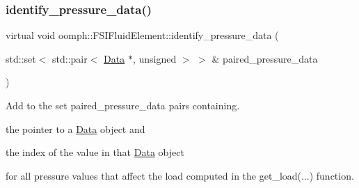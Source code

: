 \mbox{\label{classoomph_1_1FSIFluidElement_af8e0805b769b7d111eb71f223fc83df8}} 
\subsubsection{\texorpdfstring{identify\+\_\+pressure\+\_\+data()}{identify\_pressure\_data()}}
{\footnotesize\ttfamily virtual void oomph\+::\+F\+S\+I\+Fluid\+Element\+::identify\+\_\+pressure\+\_\+data (\begin{DoxyParamCaption}\item[{std\+::set$<$ std\+::pair$<$ \hyperlink{classoomph_1_1Data}{Data} $\ast$, unsigned $>$ $>$ \&}]{paired\+\_\+pressure\+\_\+data }\end{DoxyParamCaption})\hspace{0.3cm}{\ttfamily [pure virtual]}}



Add to the set {\ttfamily paired\+\_\+pressure\+\_\+data} pairs containing. 


\begin{DoxyItemize}
\item the pointer to a \hyperlink{classoomph_1_1Data}{Data} object and
\item the index of the value in that \hyperlink{classoomph_1_1Data}{Data} object
\end{DoxyItemize}for all pressure values that affect the load computed in the {\ttfamily get\+\_\+load}(...) function. 


